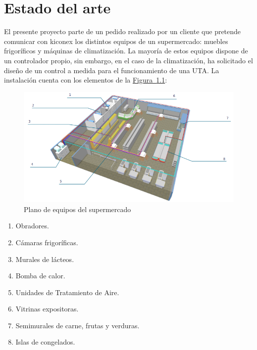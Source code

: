 
\cleardoublepage
\chapter{Estado del arte}

\label{chap:estadoArte} %

El presente proyecto parte de un pedido realizado por un cliente que pretende comunicar con kiconex los distintos equipos de un supermercado: muebles frigoríficos y máquinas de climatización. La mayoría de estos equipos dispone de un controlador propio, sin embargo, en el caso de la climatización, ha solicitado el diseño de un control a medida para el funcionamiento de una UTA. La instalación cuenta con los elementos de la \hyperref[figura:planoSupermercado]{Figura~\ref{figura:planoSupermercado}}:

\hspace{1em}

\begin{figure}[h]
  \centering
  \includegraphics[width=16cm, keepaspectratio]{img/planoSupermercado}
  \caption{Plano de equipos del supermercado}
  \label{figura:planoSupermercado}
\end{figure}

\begin{enumerate}
  \item Obradores.
  \item Cámaras frigoríficas.
  \item Murales de lácteos.
  \item Bomba de calor.
  \item Unidades de Tratamiento de Aire.
  \item Vitrinas expositoras.
  \item Semimurales de carne, frutas y verduras.
  \item Islas de congelados.
\end{enumerate}

